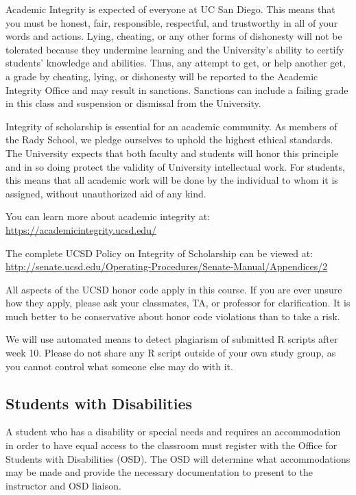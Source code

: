 \documentclass[12pt]{article}
\begin{document}
Academic Integrity is expected of everyone at UC San Diego. This means that you must be honest, fair, responsible, respectful, and trustworthy in all of your words and actions. Lying, cheating, or any other forms of dishonesty will not be tolerated because they undermine learning and the University's ability to certify students' knowledge and abilities. Thus, any attempt to get, or help another get, a grade by cheating, lying, or dishonesty will be reported to the Academic Integrity Office and may result in sanctions. Sanctions can include a failing grade in this class and suspension or dismissal from the University. 

Integrity of scholarship is essential for an academic community. As members of the Rady School, we pledge ourselves to uphold the highest ethical standards. The University expects that both faculty and students will honor this principle and in so doing protect the validity of University intellectual work. For students, this means that all academic work will be done by the individual to whom it is assigned, without unauthorized aid of any kind.

You can learn more about academic integrity at: \newline 
\url{https://academicintegrity.ucsd.edu/}

The complete UCSD Policy on Integrity of Scholarship can be viewed at: \newline
\url{http://senate.ucsd.edu/Operating-Procedures/Senate-Manual/Appendices/2}

All aspects of the UCSD honor code apply in this course. If you are ever unsure how they apply, please ask your classmates, TA, or professor for clarification. It is much better to be conservative about honor code violations than to take a risk. %

We will use automated means to detect plagiarism of submitted R scripts after week 10. Please do not share any R script outside of your own study group, as you cannot control what someone else may do with it.

\vspace{0.5cm}


\subsection*{Students with Disabilities}

A student who has a disability or special needs and requires an accommodation in order to have equal access to the classroom must register with the Office for Students with Disabilities (OSD). The OSD will determine what accommodations may be made and provide the necessary documentation to present to the instructor and OSD liaison. 
\end{document}
